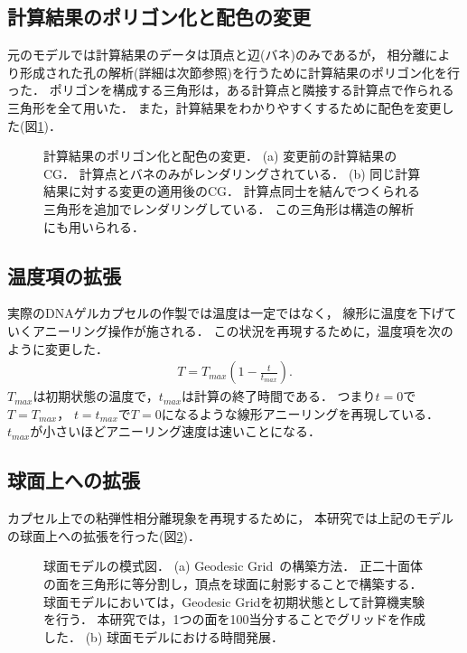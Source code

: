 \subsection{計算結果のポリゴン化と配色の変更}
元のモデルでは計算結果のデータは頂点と辺(バネ)のみであるが，
相分離により形成された孔の解析(詳細は次節参照)を行うために計算結果のポリゴン化を行った．
ポリゴンを構成する三角形は，ある計算点と隣接する計算点で作られる三角形を全て用いた．
また，計算結果をわかりやすくするために配色を変更した(図\ref{fig:polygon})．
\begin{figure}
    \centering
    
    \caption{
        計算結果のポリゴン化と配色の変更．
        (a) 変更前の計算結果のCG．
            計算点とバネのみがレンダリングされている．
        (b) 同じ計算結果に対する変更の適用後のCG．
            計算点同士を結んでつくられる三角形を追加でレンダリングしている．
            この三角形は構造の解析にも用いられる．
    }
    \label{fig:polygon}
\end{figure}


\subsection{温度項の拡張}
実際のDNAゲルカプセルの作製では温度は一定ではなく，
線形に温度を下げていくアニーリング操作が施される．
この状況を再現するために，温度項を次のように変更した．
\begin{eqnarray}
    \label{eq:thermal}
    T = T_{max}\left(1-\frac{t}{t_{max}}\right). 
\end{eqnarray}
$T_{max}$は初期状態の温度で，$t_{max}$は計算の終了時間である．
つまり$t=0$で$T=T_{max}$，
$t=t_{max}$で$T=0$になるような線形アニーリングを再現している．
$t_{max}$が小さいほどアニーリング速度は速いことになる．


\subsection{球面上への拡張}
カプセル上での粘弾性相分離現象を再現するために，
本研究では上記のモデルの球面上への拡張を行った(図\ref{fig:model_sphere})．
\begin{figure}
    \centering
    
    \caption{
        球面モデルの模式図．
        (a) Geodesic Grid~\cite{Geodesic}の構築方法．
            正二十面体の面を三角形に等分割し，頂点を球面に射影することで構築する．
            球面モデルにおいては，Geodesic Gridを初期状態として計算機実験を行う．
            本研究では，1つの面を100当分することでグリッドを作成した．
        (b) 球面モデルにおける時間発展．
    }
    \label{fig:model_sphere}
\end{figure}

